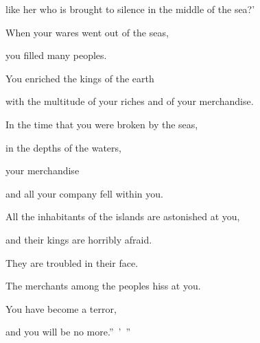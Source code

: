 {\par }{\QB like her who is brought to silence in the middle of the sea?’
\par }{\Q {}When your wares went out of the seas,
\par }{\QB you filled many peoples.
\par }{\Q You enriched the kings of the earth
\par }{\QB with the multitude of your riches and of your merchandise.
\par }{\Q {}In the time that you were broken by the seas,
\par }{\QB in the depths of the waters,
\par }{\Q your merchandise
\par }{\QB and all your company fell within you.
\par }{\Q {}All the inhabitants of the islands are astonished at you,
\par }{\QB and their kings are horribly afraid.
\par }{\QB They are troubled in their face.
\par }{\Q {}The merchants among the peoples hiss at you.
\par }{\QB You have become a terror,
\par }{\QB and you will be no more.” ’ ”

}
